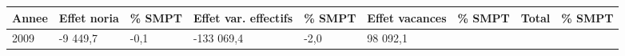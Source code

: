 \begin{longtable}[]{@{}lllllllll@{}}
\toprule
\begin{minipage}[b]{0.05\columnwidth}\raggedright
Annee\strut
\end{minipage} & \begin{minipage}[b]{0.10\columnwidth}\raggedright
Effet noria\strut
\end{minipage} & \begin{minipage}[b]{0.06\columnwidth}\raggedright
\% SMPT\strut
\end{minipage} & \begin{minipage}[b]{0.17\columnwidth}\raggedright
Effet var. effectifs\strut
\end{minipage} & \begin{minipage}[b]{0.06\columnwidth}\raggedright
\% SMPT\strut
\end{minipage} & \begin{minipage}[b]{0.12\columnwidth}\raggedright
Effet vacances\strut
\end{minipage} & \begin{minipage}[b]{0.06\columnwidth}\raggedright
\% SMPT\strut
\end{minipage} & \begin{minipage}[b]{0.08\columnwidth}\raggedright
Total\strut
\end{minipage} & \begin{minipage}[b]{0.06\columnwidth}\raggedright
\% SMPT\strut
\end{minipage}\tabularnewline
\midrule
\endhead
\begin{minipage}[t]{0.05\columnwidth}\raggedright
2009\strut
\end{minipage} & \begin{minipage}[t]{0.10\columnwidth}\raggedright
-9 449,7\strut
\end{minipage} & \begin{minipage}[t]{0.06\columnwidth}\raggedright
-0,1\strut
\end{minipage} & \begin{minipage}[t]{0.17\columnwidth}\raggedright
-133 069,4\strut
\end{minipage} & \begin{minipage}[t]{0.06\columnwidth}\raggedright
-2,0\strut
\end{minipage} & \begin{minipage}[t]{0.12\columnwidth}\raggedright
98 092,1\strut
\end{minipage} & \begin{minipage}[t]{0.06\columnwidth}\raggedright

\end{minipage}
\end{longtable}
